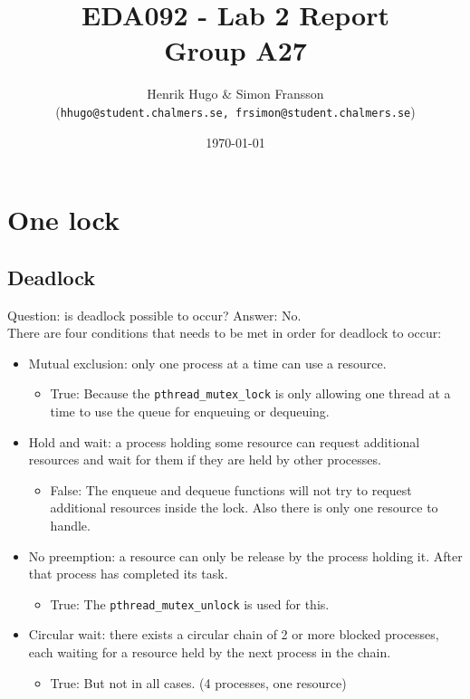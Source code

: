 \documentclass[a4paper,11pt,twoside,fleqn]{article}
\title{	
\normalfont \normalsize 
\huge EDA092 - Lab 2 Report \\ Group A27 \\ %
}
\author{Henrik Hugo \& Simon Fransson \\ (\texttt{hhugo@student.chalmers.se, frsimon@student.chalmers.se})} %
\date{\normalsize\today} %
\begin{document}
\maketitle %


\section{One lock}


\subsection*{\textbf{Deadlock}}

Question: is deadlock possible to occur? Answer: No.
\\
There are four conditions that needs to be met in order for deadlock to occur:
\begin{itemize}

\item
Mutual exclusion: only one process at a time can use a resource.
\begin{itemize} \item True: Because the \verb+pthread_mutex_lock+ is only allowing one thread at a time to use the queue for enqueuing or dequeuing.
\end{itemize}

\item Hold and wait: a process holding some resource can request additional resources and wait for them if they are held by other processes.
\begin{itemize}
\item False: The enqueue and dequeue functions will not try to request additional resources inside the lock. Also there is only one resource to handle.
\end{itemize}

\item No preemption: a resource can only be release by the process holding it. After that process has completed its task.
\begin{itemize}
\item True: The \verb+pthread_mutex_unlock+ is used for this.
\end{itemize} 

\item Circular wait: there exists a circular chain of 2 or more blocked processes, each waiting for a resource held by the next process in the chain.

\begin{itemize}
\item True: But not in all cases. (4 processes, one resource) 
\end{itemize} 
\end{itemize}
\end{document}
